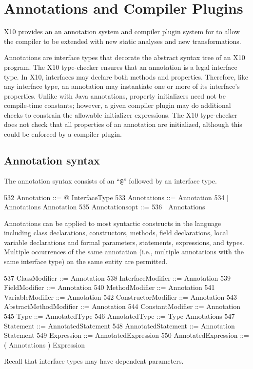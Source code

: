 \chapter{Annotations and Compiler
Plugins}\label{XtenAnnotations}


X10 provides an 
an annotation system and compiler plugin system for to allow the
compiler to be extended with new static analyses and new
transformations.

Annotations are interface types that decorate the abstract syntax tree
of an X10 program.  The X10 type-checker ensures that an annotation
is a legal interface type.
In X10, interfaces may declare
both methods and properties.  Therefore, like any interface type, an
annotation may instantiate
one or more of its interface's properties.
Unlike with Java
annotations,
property initializers need not be
compile-time constants;
however, a given compiler plugin
may do additional checks to constrain the allowable
initializer expressions.
The X10 type-checker does not check that
all properties of an annotation are initialized,
although this could be enforced by
a compiler plugin.

\section{Annotation syntax}

The annotation syntax consists of an ``\texttt{@}'' followed by an interface type.
\begin{x10}
532   Annotation ::= @ InterfaceType
533   Annotations ::= Annotation
534     | Annotations Annotation
535   Annotationsopt ::=
536     | Annotations
\end{x10}
Annotations can be applied to most syntactic constructs in the language
including class declarations, constructors, methods, field declarations,
local variable declarations and formal parameters, statements,
expressions, and types.
Multiple occurrences of the same annotation (i.e., multiple
annotations with the same interface type) on the same entity are permitted.

\begin{x10}
537   ClassModifier ::= Annotation
538   InterfaceModifier ::= Annotation
539   FieldModifier ::= Annotation
540   MethodModifier ::= Annotation
541   VariableModifier ::= Annotation
542   ConstructorModifier ::= Annotation
543   AbstractMethodModifier ::= Annotation
544   ConstantModifier ::= Annotation
545   Type ::= AnnotatedType
546   AnnotatedType ::= Type Annotations
547   Statement ::= AnnotatedStatement
548   AnnotatedStatement ::= Annotation Statement
549   Expression ::= AnnotatedExpression
550   AnnotatedExpression ::= ( Annotations ) Expression
\end{x10}
\noindent
Recall that interface types may have dependent parameters.

